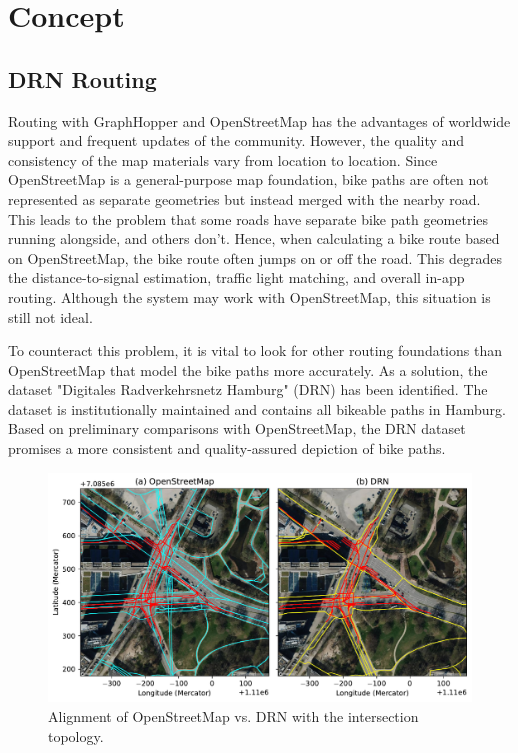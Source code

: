 \section{Concept}

\subsection{DRN Routing}

Routing with GraphHopper and OpenStreetMap has the advantages of worldwide support and frequent updates of the community. However, the quality and consistency of the map materials vary from location to location. Since OpenStreetMap is a general-purpose map foundation, bike paths are often not represented as separate geometries but instead merged with the nearby road. This leads to the problem that some roads have separate bike path geometries running alongside, and others don't. Hence, when calculating a bike route based on OpenStreetMap, the bike route often jumps on or off the road. This degrades the distance-to-signal estimation, traffic light matching, and overall in-app routing. Although the system may work with OpenStreetMap, this situation is still not ideal.

To counteract this problem, it is vital to look for other routing foundations than OpenStreetMap that model the bike paths more accurately. As a solution, the dataset "Digitales Radverkehrsnetz Hamburg" (DRN) has been identified. The dataset is institutionally maintained and contains all bikeable paths in Hamburg. Based on preliminary comparisons with OpenStreetMap, the DRN dataset promises a more consistent and quality-assured depiction of bike paths.

\begin{figure}[htbp]
\centering
\includegraphics[width=\linewidth]{images/routing-drn-osm-intersection.pdf}
\caption{Alignment of OpenStreetMap vs. DRN with the intersection topology.}
\label{fig:comparison}
\end{figure}


